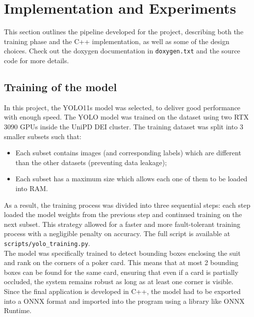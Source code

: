 \section{Implementation and Experiments} \label{sec:experiments}
This section outlines the pipeline developed for the project, describing both the training phase and the C++ implementation, as well as some of the design choices.
Check out the doxygen documentation in \texttt{doxygen.txt} and the source code for more details.

\subsection{Training of the model}
In this project, the YOLO11s model was selected, to deliver good performance with enough speed.
The YOLO model was trained on the dataset using two RTX 3090 GPUs inside the UniPD DEI cluster.
The training dataset was split into 3 smaller subsets such that:
\begin{itemize}
    \item Each subset contains images (and corresponding labels) which are different than the other datasets (preventing data leakage);
    \item Each subset has a maximum size which allows each one of them to be loaded into RAM.
\end{itemize}
As a result, the training process was divided into three sequential steps: each step loaded the model weights from the 
previous step and continued training on the next subset. This strategy allowed for a faster and more fault-tolerant training process 
with a negligible penalty on accuracy. The full script is available at \texttt{scripts/yolo\_training.py}. \\ \newline
The model was specifically trained to detect bounding boxes enclosing the suit and rank on the corners of a 
poker card. This means that at most 2 bounding boxes can be found for the same card, ensuring that even if a card is partially occluded, 
the system remains robust as long as at least one corner is visible. \\ \newline
Since the final application is developed in C++, the model had to be exported into a ONNX format and imported 
into the program using a library like ONNX Runtime.

